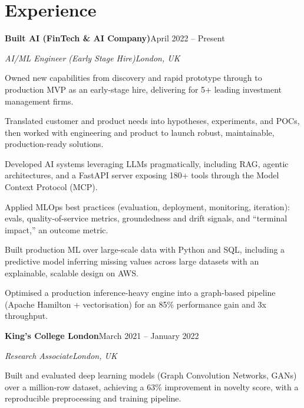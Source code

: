 \documentclass[10pt,a4paper]{article}
\newcommand{\entry}[4]{%
  {\color{company}\bfseries #1}\hfill {\color{muted}#2}\par
  \vspace{1pt}
  {\itshape #3}\hfill {\color{muted}\itshape #4}\par
  \vspace{3pt}%
}
\begin{document}
\section{Experience}
\entry{Built AI (FinTech \& AI Company)}{April 2022 -- Present}{AI/ML Engineer (Early Stage Hire)}{London, UK}
\begin{tight}
  \item Owned new capabilities from discovery and rapid prototype through to production MVP as an early-stage hire, delivering for 5+ leading investment management firms.
  \item Translated customer and product needs into hypotheses, experiments, and POCs, then worked with engineering and product to launch robust, maintainable, production-ready solutions.
  \item Developed AI systems leveraging LLMs pragmatically, including RAG, agentic architectures, and a FastAPI server exposing 180+ tools through the Model Context Protocol (MCP).
  \item Applied MLOps best practices (evaluation, deployment, monitoring, iteration): evals, quality-of-service metrics, groundedness and drift signals, and ``terminal impact,'' an outcome metric.
  \item Built production ML over large-scale data with Python and SQL, including a predictive model inferring missing values across large datasets with an explainable, scalable design on AWS.
  \item Optimised a production inference-heavy engine into a graph-based pipeline (Apache Hamilton + vectorisation) for an 85\% performance gain and 3x throughput.
\end{tight}

\entry{King's College London}{March 2021 -- January 2022}{Research Associate}{London, UK}
\begin{tight}
  \item Built and evaluated deep learning models (Graph Convolution Networks, GANs) over a million-row dataset, achieving a 63\% improvement in novelty score, with a reproducible preprocessing and training pipeline.
\end{tight}

\end{document}
